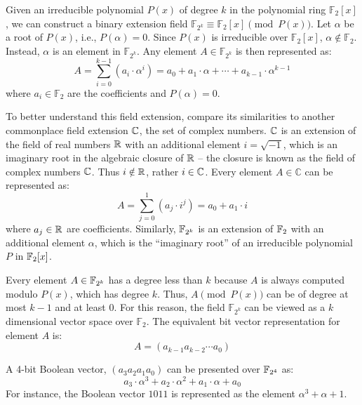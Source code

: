 Given an irreducible polynomial $P(x)$ of degree $k$ in the polynomial ring 
$\mathbb{F}_2[x]$, we can construct a binary extension field 
$\mathbb{F}_{2^k} \equiv \mathbb{F}_2[x] \pmod{P(x)}$.
Let $\alpha$ be a root of $P(x)$, i.e., $P(\alpha)=0$.
Since $P(x)$ is irreducible over
$\mathbb{F}_2[x]$, $\alpha \notin \mathbb{F}_2$. 
Instead, $\alpha$ is an element in $\mathbb{F}_{2^k}$. 
Any element $A \in \mathbb{F}_{2^k}$ is then represented as: 
\begin{equation}\label{rep:poly}
A= \sum_{i=0}^{k-1} (a_i \cdot \alpha^i) = a_0 + a_1\cdot\alpha + \cdots + a_{k-1}\cdot \alpha^{k-1}\nonumber
\end{equation}
where $a_i \in \mathbb{F}_2$ are the coefficients and $P(\alpha)=0$.

To better understand this field extension, compare its similarities to another
commonplace field extension ${\mathbb{C}}$, the set of complex numbers. ${\mathbb{C}}$ is an extension of the field 
of real numbers ${\mathbb{R}}$ with an additional element $i=\sqrt{-1}$, which is an imaginary
root in the algebraic closure of ${\mathbb{R}}$ -- the closure is known as the field of complex numbers ${\mathbb{C}}$.
Thus $i \notin {\mathbb{R}}$, rather $i \in {\mathbb{C}}$.
Every element $A \in \mathbb{C}$ can be represented as:
\begin{equation}\label{rep:polyC}
A=\sum_{j=0}^{1} (a_j \cdot i^j)=a_0+a_1\cdot i
\end{equation}
where $a_j \in {\mathbb{R}}$ are coefficients. Similarly, ${\mathbb{F}}_{2^k}$ is an extension of ${\mathbb{F}}_2$ with 
an additional element $\alpha$, which is the ``imaginary root'' of an irreducible 
polynomial $P$ in ${\mathbb{F}}_2[x]$.

Every element $A \in {\mathbb{F}}_{2^k}$ has a degree less than $k$ because 
$A$ is always computed modulo $P(x)$, which has degree $k$. 
Thus, $A\pmod {P(x)}$ can be of degree at most $k-1$ and at least $0$.
For this reason, the field $\mathbb{F}_{2^k}$ can be viewed as a $k$
dimensional vector space over $\mathbb{F}_{2}$. 
The equivalent bit vector representation for element $A$ is:
\begin{equation}
A=(a_{k-1} a_{k-2} \cdots a_{0})
\end{equation}

\begin{Example}
A 4-bit Boolean vector, $(a_{3} a_{2} a_{1} a_{0})$
can be presented over ${\mathbb{F}}_{2^4}$ as: 
\begin{equation}
a_3 \cdot \alpha^3+a_2 \cdot \alpha^2+a_1 \cdot \alpha+a_0
\end{equation}
For instance, the Boolean vector $1011$ is represented as the element 
$\alpha^3+\alpha+1$.
\end{Example}

